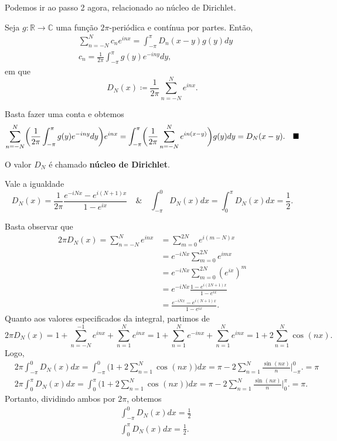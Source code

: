 \documentclass[../pde_notes.tex]{subfiles}
\begin{document}
Podemos ir ao passo 2 agora, relacionado ao núcleo de Dirichlet.
\begin{prop*}
	Seja \(g:\mathbb{R}\rightarrow \mathbb{C}\) uma função \(2\pi\)-periódica e contínua por partes. Então,
	\begin{align*}
		 & \sum\limits_{n=-N}^{N}c_{n}e^{inx}=\int_{-\pi }^{\pi }D_{n}(x-y)g(y)dy \\
		 & c_{n}=\frac{1}{2\pi }\int_{-\pi }^{\pi }g(y)e^{-iny}dy,
	\end{align*}
	em  que
	\[
		D_{N}(x)\coloneqq \frac{1}{2\pi }\sum\limits_{n=-N}^{N}e^{inx}.
	\]
\end{prop*}
\begin{proof*}
	Basta fazer uma conta e obtemos
	\[
		\sum\limits_{n=-N}^{N}\biggl(\frac{1}{2\pi }\int_{-\pi }^{\pi }g(y)e^{-iny}dy\biggr)e^{inx}=\int_{-\pi }^{\pi }\biggl(\frac{1}{2\pi }\sum\limits_{n=-N}^{N}e^{in(x-y)}\biggr)g(y)dy=D_{N}(x-y).\quad \text{$\blacksquare$}
	\]
\end{proof*}
O valor \(D_{N}\) é chamado \textbf{núcleo de Dirichlet}.
\begin{prop*}
	Vale a igualdade
	\[
		D_{N}(x)=\frac{1}{2\pi }\frac{e^{-iNx}-e^{i(N+1)x}}{1-e^{ix}} \quad\&\quad \int_{-\pi }^{0}D_{N}(x)dx=\int_{0}^{\pi }D_{N}(x)dx=\frac{1}{2}.
	\]
\end{prop*}
\begin{proof*}
	Basta observar que
	\begin{align*}
		2\pi D_{N}(x)=\sum\limits_{n=-N}^{N}e^{inx} & =\sum\limits_{m=0}^{2N}e^{i(m-N)x}          \\
		                                            & =e^{-iNx}\sum\limits_{m=0}^{2N}e^{imx}      \\
		                                            & =e^{-iNx}\sum\limits_{m=0}^{2N}(e^{ix})^{m} \\
		                                            & =e^{-iNx}\frac{1-e^{i(2N+1)x}}{1-e^{ix}}    \\
		                                            & =\frac{e^{-iNx}-e^{i(N+1)x}}{1-e^{ix}}.
	\end{align*}
	Quanto aos valores especificados da integral, partimos de
	\[
		2\pi D_{N}(x)=1+\sum\limits_{n=-N}^{-1}e^{inx}+\sum\limits_{n=1}^{N}e^{inx}=1+\sum\limits_{n=1}^{N}e^{-inx}+\sum\limits_{n=1}^{N}e^{inx}=1+2\sum\limits_{n=1}^{N}\cos^{}{(nx)}.
	\]
	Logo,
	\begin{align*}
		 & 2\pi \int_{-\pi }^{0}D_{N}(x)dx=\int_{-\pi }^{0}\biggl(1+2\sum\limits_{n=1}^{N}\cos^{}{(nx)}\biggr)dx = \pi -2\sum\limits_{n=1}^{N}\frac{\sin^{}{(nx)}}{n}\biggl|_{-\pi }^{0}\biggr.=\pi   \\
		 & 2\pi \int_{0}^{\pi }D_{N}(x)dx=\int_{0}^{\pi}\biggl(1+2\sum\limits_{n=1}^{N}\cos^{}{(nx)}\biggr)dx = \pi -2\sum\limits_{n=1}^{N}\frac{\sin^{}{(nx)}}{n}\biggl|_{0}^{\pi}\biggr.=\pi      .
	\end{align*}
	Portanto, dividindo ambos por \(2\pi \), obtemos
	\begin{align*}
		 & \int_{-\pi}^{0}D_{N}(x)dx=\frac{1}{2}       \\
		 & \int_{0}^{\pi }D_{N}(x)dx=\frac{1}{2}     .
	\end{align*}
\end{proof*}
\end{document}

